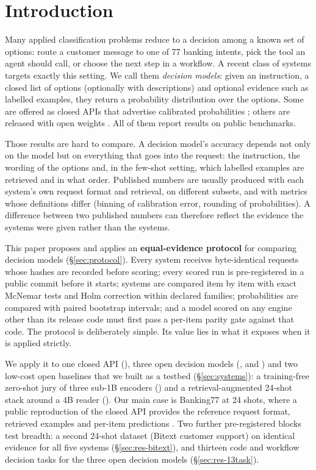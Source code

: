 \section{Introduction}
\label{sec:intro}

Many applied classification problems reduce to a decision among a known set of options: route a customer message to
one of 77 banking intents, pick the tool an agent should call, or choose the next step in a workflow. A recent class
of systems targets exactly this setting. We call them \emph{decision models}: given an instruction, a closed list of
options (optionally with descriptions) and optional evidence such as labelled examples, they return a probability
distribution over the options. Some are offered as closed APIs that advertise calibrated probabilities
\citep{typesafe-2026-jev}; others are released with open weights
\citep{cloudflare-2026-clef-card,perplexity-2026-pplx-decider-card}. All of them report results on public benchmarks.

Those results are hard to compare. A decision model's accuracy depends not only on the model but on everything that
goes into the request: the instruction, the wording of the options and, in the few-shot setting, which labelled
examples are retrieved and in what order. Published numbers are usually produced with each system's own request
format and retrieval, on different subsets, and with metrics whose definitions differ (binning of calibration error,
rounding of probabilities). A difference between two published numbers can therefore reflect the evidence the
systems were given rather than the systems.

This paper proposes and applies an \textbf{equal-evidence protocol} for comparing decision models
(\S\ref{sec:protocol}). Every system receives byte-identical requests whose hashes are recorded before scoring; every
scored run is pre-registered in a public commit before it starts; systems are compared item by item with exact
McNemar tests and Holm correction within declared families; probabilities are compared with paired bootstrap
intervals; and a model scored on any engine other than its release code must first pass a per-item parity gate
against that code. The protocol is deliberately simple. Its value lies in what it exposes when it is applied
strictly.

We apply it to one closed API (\jev), three open decision models (\clef, \flash{} and \pplx) and two low-cost open
baselines that we built as a testbed (\S\ref{sec:systems}): a training-free zero-shot jury of three sub-1B
encoders (\gj) and a retrieval-augmented 24-shot stack around a 4B reader (\orb). Our main case is Banking77
\citep{casanueva-etal-2020-efficient} at 24 shots, where a public reproduction of the closed API provides the
reference request format, retrieved examples and per-item predictions \citep{smith-2026-jev-banking77}.
Two further pre-registered blocks test breadth: a second 24-shot dataset (Bitext customer support) on identical
evidence for all five systems (\S\ref{sec:res-bitext}), and thirteen code and workflow decision tasks for the three
open decision models (\S\ref{sec:res-13task}).

